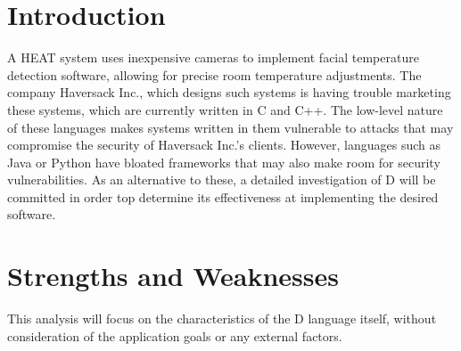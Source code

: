 \section{Introduction}
\par
A HEAT system uses inexpensive cameras to implement facial temperature detection
software, allowing for precise room temperature adjustments. The company
Haversack Inc., which designs such systems is having trouble marketing these
systems, which are currently written in C and C++. The low-level nature of these
languages makes systems written in them vulnerable to attacks that may
compromise the security of Haversack Inc.'s clients. However, languages such as
Java or Python have bloated frameworks that may also make room for security
vulnerabilities. As an alternative to these, a detailed investigation of D
will be committed in order top determine its effectiveness at implementing the
desired software.

\section{Strengths and Weaknesses}
This analysis will focus on the characteristics of the D language itself,
without consideration of the application goals or any external factors. 

